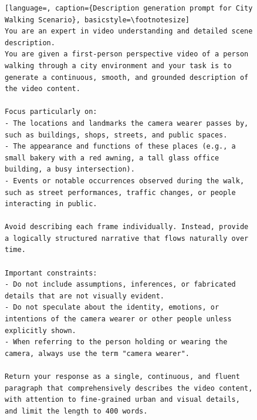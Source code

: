\begin{figure}[t]
\centering
\begin{minipage}{0.9\textwidth}
\begin{lstlisting}[language=, caption={Description generation prompt for City Walking Scenario}, basicstyle=\footnotesize]
You are an expert in video understanding and detailed scene description. 
You are given a first-person perspective video of a person walking through a city environment and your task is to generate a continuous, smooth, and grounded description of the video content.

Focus particularly on:
- The locations and landmarks the camera wearer passes by, such as buildings, shops, streets, and public spaces.
- The appearance and functions of these places (e.g., a small bakery with a red awning, a tall glass office building, a busy intersection).
- Events or notable occurrences observed during the walk, such as street performances, traffic changes, or people interacting in public.

Avoid describing each frame individually. Instead, provide a logically structured narrative that flows naturally over time.

Important constraints:
- Do not include assumptions, inferences, or fabricated details that are not visually evident.
- Do not speculate about the identity, emotions, or intentions of the camera wearer or other people unless explicitly shown.
- When referring to the person holding or wearing the camera, always use the term "camera wearer".

Return your response as a single, continuous, and fluent paragraph that comprehensively describes the video content, with attention to fine-grained urban and visual details, and limit the length to 400 words.
\end{lstlisting}
\end{minipage}
\end{figure}

